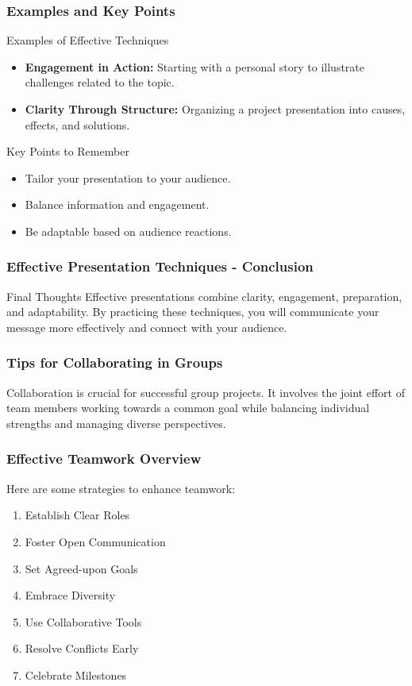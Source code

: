 \documentclass[aspectratio=169]{beamer}
\begin{document}
\begin{frame}[fragile]
    \frametitle{Examples and Key Points}
    \begin{block}{Examples of Effective Techniques}
        \begin{itemize}
            \item \textbf{Engagement in Action:} Starting with a personal story to illustrate challenges related to the topic.
            \item \textbf{Clarity Through Structure:} Organizing a project presentation into causes, effects, and solutions.
        \end{itemize}
    \end{block}

    \begin{block}{Key Points to Remember}
        \begin{itemize}
            \item Tailor your presentation to your audience.
            \item Balance information and engagement.
            \item Be adaptable based on audience reactions.
        \end{itemize}
    \end{block}
\end{frame}

\begin{frame}[fragile]
    \frametitle{Effective Presentation Techniques - Conclusion}
    \begin{block}{Final Thoughts}
        Effective presentations combine clarity, engagement, preparation, and adaptability. 
        By practicing these techniques, you will communicate your message more effectively and connect with your audience.
    \end{block}
\end{frame}

\begin{frame}[fragile]
    \frametitle{Tips for Collaborating in Groups}
    Collaboration is crucial for successful group projects. It involves the joint effort of team members working towards a common goal while balancing individual strengths and managing diverse perspectives.
\end{frame}

\begin{frame}[fragile]
    \frametitle{Effective Teamwork Overview}
    Here are some strategies to enhance teamwork:
    \begin{enumerate}
        \item Establish Clear Roles
        \item Foster Open Communication
        \item Set Agreed-upon Goals
        \item Embrace Diversity
        \item Use Collaborative Tools
        \item Resolve Conflicts Early
        \item Celebrate Milestones
    \end{enumerate}
\end{frame}
\end{document}
